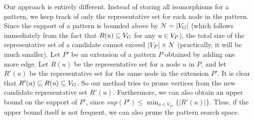 Our approach is entirely different. Instead of storing all isomorphisms
for a pattern, we keep track of only the representative set for each
node in the pattern.  Since the support of a pattern is bounded above by
$N=|V_G|$ (which follows immediately from the fact that $R(u) \subseteq
V_G$ for any $u \in V_P$), the total size of the representative set of a
candidate cannot exceed $|V_P| \times N$ (practically, it will be much
smaller).  Let $P'$ be an extension of a pattern $P$ obtained by adding
one more edge. Let $R(u)$ be the representative set for a node $u$ in
$P$, and let $R'(u)$ be the representative set for the same node in the
extension $P'$. It is clear that $R'(u) \subseteq R(u) \subseteq V_G$.
So our method tries to prune vertices from the new candidate
representative set $R'(u)$. 
Furthermore, we can also obtain an upper
bound on the support of $P'$, since $sup(P') \le \min_{u \in V_{P'}}
\{|R'(u)|\}$. Thus, if the upper bound itself is not frequent, we can
also prune the pattern search space.

